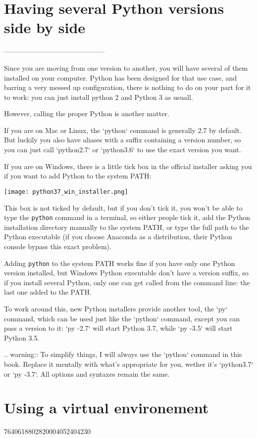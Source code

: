\section{Having several Python versions side by side}
--------------------------------------------

Since you are moving from one version to another, you will have several of them installed on your computer. Python has been designed for that use case, and barring a very messed up configuration, there is nothing to do on your part for it to work: you can just install python 2 and Python 3 as usuall.

However, calling the proper Python is another matter.

If you are on Mac or Linux, the `python` command is generally 2.7 by default. But luckily you also have aliases with a suffix containing a version number, so you can just call `python2.7` or `python3.6` to use the exact version you want.

If you are on Windows, there is a little tick box in the official installer asking you if you want to add Python to the system PATH:


\texttt{[image: python37\_win\_installer.png]}

This box is not ticked by default, but if you don't tick it, you won't be able to type the \lstinline{python} command in a terminal, so either people tick it, add the Python installation directory manually to the system PATH, or type the full path to the Python executable (if you choose Anaconda as a distribution, their Python console bypass this exact problem).

Adding \lstinline{python} to the system PATH works fine if you have only one Python version installed, but Windows Python executable don't have a version suffix, so if you install several Python, only one can get called from the command line: the last one added to the PATH.

To work around this, new Python installers provide another tool, the `py` command, which can be used just like the `python` command, except you can pass a version to it: `py -2.7` will start Python 3.7, while `py -3.5` will start Python 3.5.

.. warning:: To simplify things, I will always use the `python` command in this book. Replace it mentally with what's appropriate for you, wether it's `python3.7` or `py -3.7`. All options and syntaxes remain the same.


\section{Using a virtual environement}


7640618802820004052404230
